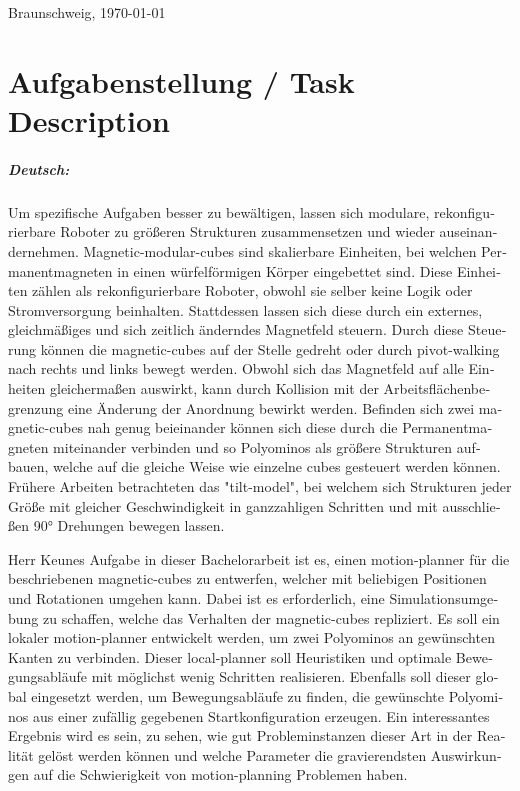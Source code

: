 \documentclass[11pt,a4paper,twoside,titlepage]{scrbook}
\theoremstyle{definition}
\begin{document}
	\par
	\bigskip\noindent Braunschweig, \today \par
	\vspace*{10mm}
	\hfill\hrulefill
	\cleardoublepage
	
	
	\chapter*{Aufgabenstellung / Task Description}


\paragraph{Deutsch:}
\begin{otherlanguage}{ngerman}
	Um spezifische Aufgaben besser zu bewältigen, lassen sich modulare, rekonfigurierbare Roboter zu größeren Strukturen zusammensetzen und wieder auseinandernehmen.
	Magnetic-modular-cubes sind skalierbare Einheiten, bei welchen Permanentmagneten in einen würfelförmigen Körper eingebettet sind.
	Diese Einheiten zählen als rekonfigurierbare Roboter, obwohl sie selber keine Logik oder Stromversorgung beinhalten.
	Stattdessen lassen sich diese durch ein externes, gleichmäßiges und sich zeitlich änderndes Magnetfeld steuern.
	Durch diese Steuerung können die magnetic-cubes auf der Stelle gedreht oder durch pivot-walking nach rechts und links bewegt werden.
	Obwohl sich das Magnetfeld auf alle Einheiten gleichermaßen auswirkt, kann durch Kollision mit der Arbeitsflächenbegrenzung eine Änderung der Anordnung bewirkt werden.
	Befinden sich zwei magnetic-cubes nah genug beieinander können sich diese durch die Permanentmagneten miteinander verbinden und so Polyominos als größere Strukturen aufbauen,
	welche auf die gleiche Weise wie einzelne cubes gesteuert werden können.
	Frühere Arbeiten betrachteten das "tilt-model", bei welchem sich Strukturen jeder Größe mit gleicher Geschwindigkeit in ganzzahligen Schritten und mit ausschließen 90° Drehungen bewegen lassen.
	
	Herr Keunes Aufgabe in dieser Bachelorarbeit ist es, einen motion-planner für die beschriebenen magnetic-cubes zu entwerfen, welcher mit beliebigen Positionen und Rotationen umgehen kann.
	Dabei ist es erforderlich, eine Simulationsumgebung zu schaffen, welche das Verhalten der magnetic-cubes repliziert.
	Es soll ein lokaler motion-planner entwickelt werden, um zwei Polyominos an gewünschten Kanten zu verbinden.
	Dieser local-planner soll Heuristiken und optimale Bewegungsabläufe mit möglichst wenig Schritten realisieren.
	Ebenfalls soll dieser global eingesetzt werden, um Bewegungsabläufe zu finden, die gewünschte Polyominos aus einer zufällig gegebenen Startkonfiguration erzeugen.
	Ein interessantes Ergebnis wird es sein, zu sehen, wie gut Probleminstanzen dieser Art in der Realität gelöst werden können und welche Parameter die gravierendsten Auswirkungen auf die Schwierigkeit von motion-planning Problemen haben. 
	
\end{otherlanguage}
\end{document}
